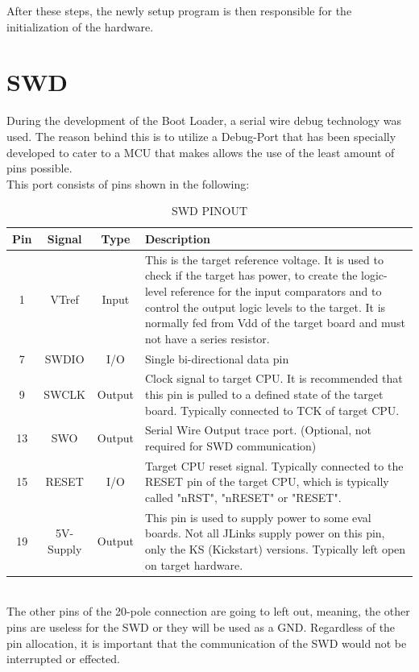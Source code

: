 After these steps, the newly setup program is then responsible for the initialization 
of the hardware.\\

\section{SWD}
During the development of the Boot Loader, a serial wire debug technology was used. 
The reason behind this is to utilize a Debug-Port that has been specially developed to 
cater to a MCU that makes allows the use of the least amount of pins possible.\\
This port consists of pins shown in the following:\\
\begin{table}[ht]
\centering
\begin{tabular}{|c|c|c|p{10cm}|}
\hline \hline
	Pin & Signal & Type & Description \\ \hline
1 & VTref & Input & This is the target reference voltage. It is used to
 check if the target has power, to create the logic-level reference for
 the input comparators and to control the output logic levels to the target.
 It is normally fed from Vdd of the target board and must not have a series resistor.\\ \hline
7 & SWDIO & I/O & Single bi-directional data pin\\ \hline
9 & SWCLK & Output & Clock signal to target CPU. It is recommended that
 this pin is pulled to a defined state of the target board. Typically
 connected to TCK of target CPU.\\ \hline
13 & SWO & Output & Serial Wire Output trace port. (Optional, not required
for SWD communication)\\ \hline
15 & RESET & I/O & Target CPU reset signal. Typically connected to the
 RESET pin of the target CPU, which is typically called "nRST", "nRESET"
 or "RESET".\\ \hline
19 & 5V-Supply & Output & This pin is used to supply power to some eval boards.
Not all JLinks supply power on this pin, only the KS (Kickstart) versions.
Typically left open on target hardware.\\ \hline
\end{tabular}
\caption{SWD PINOUT}
\end{table}\\

The other pins of the 20-pole connection are going to left out, meaning, the other 
pins are useless for the SWD or they will be used as a GND. Regardless of the pin allocation, 
it is important that the communication of the SWD would not be interrupted or effected. 

